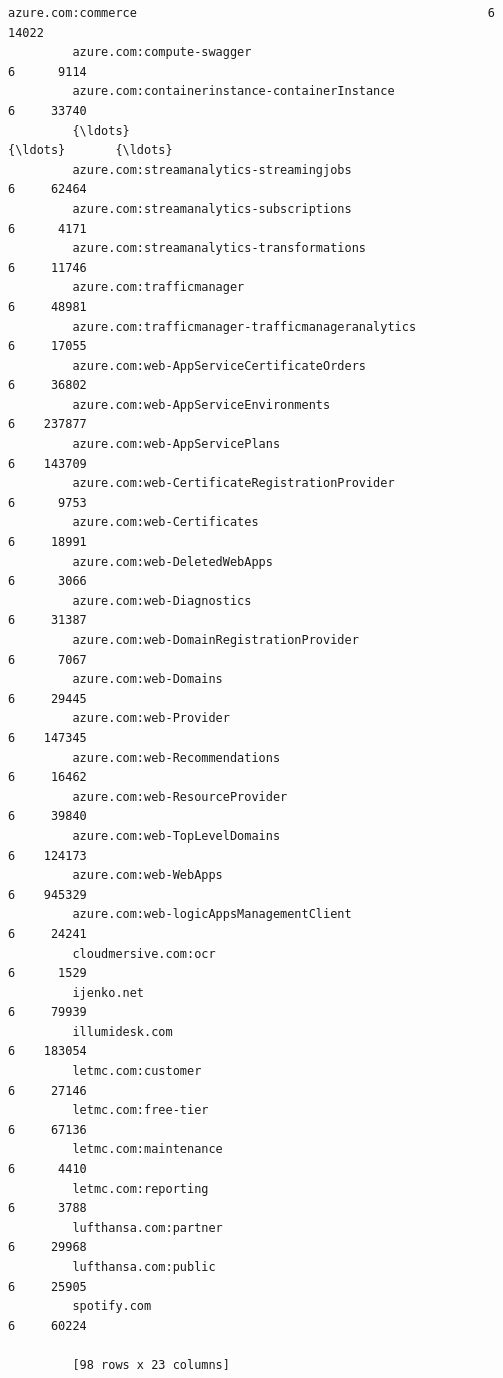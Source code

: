 \documentclass[11pt]{article}
\begin{document}
\begin{Verbatim}[commandchars=\\\{\}]
         azure.com:commerce                                                 6     14022  
         azure.com:compute-swagger                                          6      9114  
         azure.com:containerinstance-containerInstance                      6     33740  
         {\ldots}                                                              {\ldots}       {\ldots}  
         azure.com:streamanalytics-streamingjobs                            6     62464  
         azure.com:streamanalytics-subscriptions                            6      4171  
         azure.com:streamanalytics-transformations                          6     11746  
         azure.com:trafficmanager                                           6     48981  
         azure.com:trafficmanager-trafficmanageranalytics                   6     17055  
         azure.com:web-AppServiceCertificateOrders                          6     36802  
         azure.com:web-AppServiceEnvironments                               6    237877  
         azure.com:web-AppServicePlans                                      6    143709  
         azure.com:web-CertificateRegistrationProvider                      6      9753  
         azure.com:web-Certificates                                         6     18991  
         azure.com:web-DeletedWebApps                                       6      3066  
         azure.com:web-Diagnostics                                          6     31387  
         azure.com:web-DomainRegistrationProvider                           6      7067  
         azure.com:web-Domains                                              6     29445  
         azure.com:web-Provider                                             6    147345  
         azure.com:web-Recommendations                                      6     16462  
         azure.com:web-ResourceProvider                                     6     39840  
         azure.com:web-TopLevelDomains                                      6    124173  
         azure.com:web-WebApps                                              6    945329  
         azure.com:web-logicAppsManagementClient                            6     24241  
         cloudmersive.com:ocr                                               6      1529  
         ijenko.net                                                         6     79939  
         illumidesk.com                                                     6    183054  
         letmc.com:customer                                                 6     27146  
         letmc.com:free-tier                                                6     67136  
         letmc.com:maintenance                                              6      4410  
         letmc.com:reporting                                                6      3788  
         lufthansa.com:partner                                              6     29968  
         lufthansa.com:public                                               6     25905  
         spotify.com                                                        6     60224  
         
         [98 rows x 23 columns]
\end{Verbatim}
            

    
    
    
    
\end{document}
